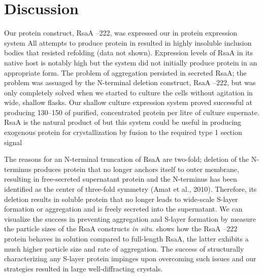 \section{Discussion}\label{sec:crystal-discussion}
Our protein construct, RsaA --222, was expressed our in \caulobacter protein expression system All attempts to produce protein in \ecoli{} resulted in highly insoluble inclusion bodies that resisted refolding (data not shown). Expression levels of RsaA in its native host is notably high but the system did not initially produce protein in an appropriate form. The problem of aggregation persisted in \caulobacter secreted RsaA; the problem was assuaged by the N-terminal deletion construct, RsaA --222, but was only completely solved when we started to culture the cells without agitation in wide, shallow flasks. Our shallow culture expression system proved successful at producing 130--150 \milligram  of purified, concentrated protein per litre of culture supernate. RsaA is the natural product of \caulobacter but this system could be useful in producing exogenous protein for crystallization by fusion to the required type 1 section signal

The reasons for an N-terminal truncation of RsaA are two-fold; deletion of the
N-terminus produces protein that no longer anchors itself to outer membrane,
resulting in free-secreted supernatant protein and the N-terminus has been
identified as the center of three-fold symmetry (Amat et al., 2010). Therefore,
its deletion results in soluble protein that no longer leads to wide-scale
\ac{S-layer} formation or aggregation and is freely secreted into the
supernatant. We can visualize the success in preventing aggregation and \ac{S-layer} formation by measure the particle sizes of the RsaA constructs \textit{in situ}.  shows how the RsaA --222 protein behaves in solution compared to full-length RsaA, the latter exhibits a much higher particle size and rate of aggregation. The success of structurally characterizing any S-layer protein impinges upon overcoming such issues and our strategies resulted in large well-diffracting crystals.

